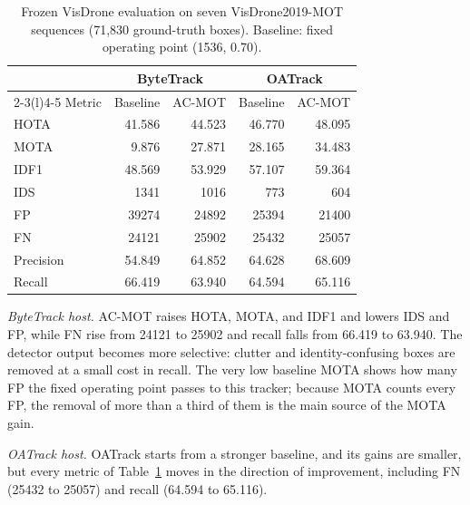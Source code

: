 \documentclass[journal]{new-aiaa}
\begin{document}
\begin{table}[htbp]
\caption{Frozen VisDrone evaluation on seven VisDrone2019-MOT sequences
(71,830 ground-truth boxes). Baseline: fixed operating point (1536, 0.70).}
\label{tab:visdrone}
\centering\footnotesize
\setlength{\tabcolsep}{4pt}
\begin{tabular}{@{}lrrrr@{}}
\toprule
 & \multicolumn{2}{c}{ByteTrack} & \multicolumn{2}{c}{OATrack}\\
\cmidrule(lr){2-3}\cmidrule(l){4-5}
Metric & Baseline & AC-MOT & Baseline & AC-MOT\\
\midrule
HOTA & 41.586 & 44.523 & 46.770 & 48.095\\
MOTA & 9.876 & 27.871 & 28.165 & 34.483\\
IDF1 & 48.569 & 53.929 & 57.107 & 59.364\\
IDS & 1341 & 1016 & 773 & 604\\
FP & 39274 & 24892 & 25394 & 21400\\
FN & 24121 & 25902 & 25432 & 25057\\
Precision & 54.849 & 64.852 & 64.628 & 68.609\\
Recall & 66.419 & 63.940 & 64.594 & 65.116\\
\bottomrule
\end{tabular}
\end{table}

\emph{ByteTrack host.} AC-MOT raises HOTA, MOTA, and IDF1 and lowers IDS and
FP, while FN rise from 24121 to 25902 and recall falls from 66.419 to 63.940.
The detector output becomes more selective: clutter and identity-confusing
boxes are removed at a small cost in recall. The very low baseline MOTA shows
how many FP the fixed operating point passes to this tracker; because MOTA
counts every FP, the removal of more than a third of them is the main source
of the MOTA gain.

\emph{OATrack host.} OATrack starts from a stronger baseline, and its gains
are smaller, but every metric of Table~\ref{tab:visdrone} moves in the
direction of improvement, including FN (25432 to 25057) and recall (64.594 to
65.116).
\end{document}
